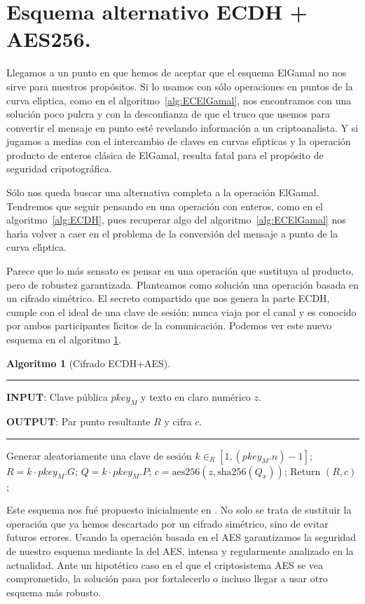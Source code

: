 \documentclass{llncs}
\def\ce{curva{} el\'{\i}ptica}%
\def\ces{curvas{} el\'{\i}pticas}%
\theoremstyle{plain}        			%
\theoremstyle{definition}   			%
\theoremstyle{saltolinea}   			%
\newtheorem{algo}{Algoritmo}
\begin{document}
\section{Esquema alternativo ECDH + AES256.}

Llegamos a un punto en que hemos de aceptar que el esquema ElGamal no nos sirve para nuestros prop\'ositos. Si lo usamos con s\'olo operaciones en puntos de la \ce{}, como en el algoritmo~\ref{alg:ECElGamal}, nos encontramos con una soluci\'on poco pulcra y con la desconfianza de que el truco que usemos para convertir el mensaje en punto est\'e revelando informaci\'on a un criptoanalista. Y si jugamos a medias con el intercambio de claves en \ces{} y la operaci\'on producto de enteros cl\'asica de ElGamal, resulta fatal para el prop\'osito de seguridad cripotogr\'afica.

S\'olo nos queda buscar una alternativa completa a la operaci\'on ElGamal. Tendremos que seguir pensando en una operaci\'on con enteros, como en el algoritmo~\ref{alg:ECDH}, pues recuperar algo del algoritmo~\ref{alg:ECElGamal} nos har\'{\i}a volver a caer en el problema de la conversi\'on del mensaje a punto de la \ce{}.

Parece que lo m\'as sensato es pensar en una operaci\'on que sustituya al producto, pero de robustez garantizada. Planteamos como soluci\'on una operaci\'on basada en un cifrado sim\'etrico. El secreto compartido que nos genera la parte ECDH, cumple con el ideal de una clave de sesi\'on: nunca viaja por el canal y es conocido por ambos participantes l\'{\i}citos de la comunicaci\'on. Podemos ver este nuevo esquema en el algoritmo \ref{alg:AES}.

\begin{algo}[Cifrado ECDH+AES]\label{alg:AES}
\parbox[b]{\linewidth}{%
\hrule
\smallskip
{\bf INPUT}: Clave p\'ublica $pkey_{M}$ y texto en claro num\'erico $z$.

{\bf OUTPUT}: Par punto resultante $R$ y cifra $c$.
\vspace{1.5mm}
\hrule
}%
\begin{algorithmic}[1]
\STATE Generar aleatoriamente una clave de sesi\'on $k\in_{R}\left[1,\left(pkey_{M}.n\right)-1\right]$;
\STATE $R=k\cdot pkey_{M}.G$;
\STATE $Q=k\cdot pkey_{M}.P$; 
\STATE $c=\textrm{aes256}(z,\textrm{sha256}(Q_x))$;
\STATE Return $(R,c)$;
\end{algorithmic}
\end{algo}

Este esquema nos fu\'e propuesto inicialmente en \cite{MMR}. No solo se trata de sustituir la operaci\'on que ya hemos descartado por un cifrado sim\'etrico, sino de evitar futuros errores. Usando la operaci\'on basada en el AES garantizamos la seguridad de nuestro esquema mediante la del AES, intensa y regularmente analizado en la actualidad. Ante un hipot\'etico caso en el que el criptosistema AES se vea comprometido, la soluci\'on pasa por fortalecerlo o incluso llegar a usar otro esquema m\'as robusto.
\end{document}
